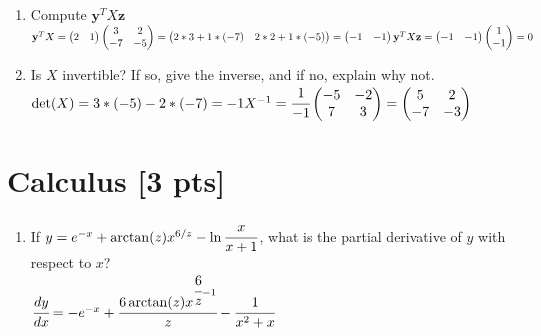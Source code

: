 \documentclass[a4paper]{article}
\theoremstyle{definition}
\newenvironment{soln}{
	\leavevmode\color{blue}\ignorespaces
}{}
\begin{document}
	\begin{enumerate}
		\item 	Compute $\mathbf{y}^{T} X \mathbf{z}$\\
			    \begin{soln} $\mathbf{y}^{T} X = \begin{pmatrix}
			        2 & 1
			    \end{pmatrix} \begin{pmatrix}
			        3 & 2 \\ -7 & -5
			    \end{pmatrix} = \begin{pmatrix}
			        2*3 + 1*(-7) & 2*2 + 1 * (-5)
			    \end{pmatrix} = \begin{pmatrix}
			        -1 & -1
			    \end{pmatrix} \\ \mathbf{y}^{T} X \mathbf{z} = \begin{pmatrix}
			        -1 & -1
			    \end{pmatrix} \begin{pmatrix}
			        1 \\ -1
			    \end{pmatrix} = 0 $ \end{soln}
		\item 	Is $X$ invertible? If so, give the inverse, and if no, explain why not.\\
		        \begin{soln} $\det(X) = 3*(-5) - 2*(-7) = -1 \\ X^{-1} = \cfrac{1}{-1} \begin{pmatrix}
		            -5 & -2 \\ 7 & 3
		        \end{pmatrix} = \begin{pmatrix}
		            5 & 2 \\ -7 & -3
		        \end{pmatrix}$ \end{soln}
	\end{enumerate}
	
	
	\section{Calculus [3 pts]}
	\begin{enumerate}
		\item If $y = e^{-x} + \arctan(z)x^{6/z} - \ln\cfrac{x}{x+1}$, what is the partial derivative of $y$ with respect to $x$?\\
		\begin{soln} $\cfrac{dy}{dx} = -e^{-x} + \cfrac{6\arctan(z)x^{\cfrac{6}{z} - 1}}{z} - \cfrac{1}{x^{2} + x}$ \end{soln}
	\end{enumerate}
	
\end{document}
